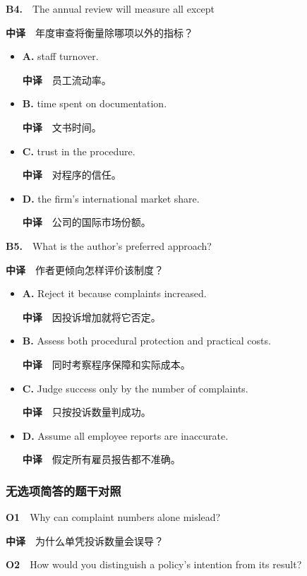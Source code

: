 \documentclass[
  11pt,
]{ctexart}
\begin{document}
\textbf{B4.}　The annual review will measure all except

\textbf{中译}　年度审查将衡量除哪项以外的指标？

\begin{itemize}
\item
  \textbf{A.} staff turnover.

  \textbf{中译}　员工流动率。
\item
  \textbf{B.} time spent on documentation.

  \textbf{中译}　文书时间。
\item
  \textbf{C.} trust in the procedure.

  \textbf{中译}　对程序的信任。
\item
  \textbf{D.} the firm's international market share.

  \textbf{中译}　公司的国际市场份额。
\end{itemize}

\textbf{B5.}　What is the author's preferred approach?

\textbf{中译}　作者更倾向怎样评价该制度？

\begin{itemize}
\item
  \textbf{A.} Reject it because complaints increased.

  \textbf{中译}　因投诉增加就将它否定。
\item
  \textbf{B.} Assess both procedural protection and practical costs.

  \textbf{中译}　同时考察程序保障和实际成本。
\item
  \textbf{C.} Judge success only by the number of complaints.

  \textbf{中译}　只按投诉数量判成功。
\item
  \textbf{D.} Assume all employee reports are inaccurate.

  \textbf{中译}　假定所有雇员报告都不准确。
\end{itemize}

\subsubsection{无选项简答的题干对照}\label{ux65e0ux9009ux9879ux7b80ux7b54ux7684ux9898ux5e72ux5bf9ux7167-1}

\textbf{O1}　Why can complaint numbers alone mislead?

\textbf{中译}　为什么单凭投诉数量会误导？

\textbf{O2}　How would you distinguish a policy's intention from its
result?
\end{document}
